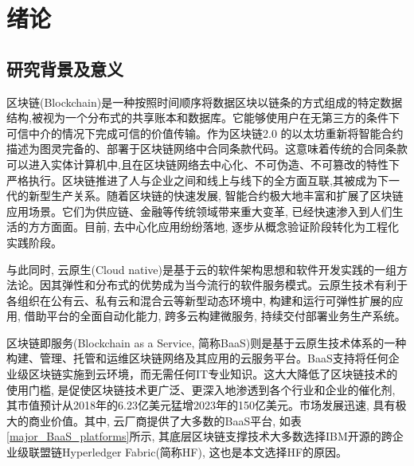 \chapter{绪论}

\section{研究背景及意义}

区块链(Blockchain)是一种按照时间顺序将数据区块以链条的方式组成的特定数据结构,被视为一个分布式的共享账本和数据库。它能够使用户在无第三方的条件下可信中介的情况下完成可信的价值传输\cite{SurveyofEnterpriseBlockchains}。作为区块链2.0 的以太坊\footnotemark[1]重新将智能合约描述为图灵完备的、部署于区块链网络中合同条款代码。这意味着传统的合同条款可以进入实体计算机中,且在区块链网络去中心化、不可伪造、不可篡改的特性下严格执行。区块链推进了人与企业之间和线上与线下的全方面互联,其被成为下一代的新型生产关系。随着区块链的快速发展, 智能合约极大地丰富和扩展了区块链应用场景。它们为供应链、金融等传统领域带来重大变革, 已经快速渗入到人们生活的方方面面。目前, 去中心化应用纷纷落地, 逐步从概念验证阶段转化为工程化实践阶段\footnotemark[2]。

与此同时, 云原生(Cloud native)是基于云的软件架构思想和软件开发实践的一组方法论。因其弹性和分布式的优势成为当今流行的软件服务模式。云原生技术有利于各组织在公有云、私有云和混合云等新型动态环境中, 构建和运行可弹性扩展的应用, 借助平台的全面自动化能力, 跨多云构建微服务, 持续交付部署业务生产系统。

区块链即服务(Blockchain as a Service, 简称BaaS)则是基于云原生技术体系的一种构建、管理、托管和运维区块链网络及其应用的云服务平台\cite{onik2019performance}。BaaS支持将任何企业级区块链实施到云环境，而无需任何IT专业知识。这大大降低了区块链技术的使用门槛, 是促使区块链技术更广泛、更深入地渗透到各个行业和企业的催化剂, 其市值预计从2018年的6.23亿美元猛增2023年的150亿美元\footnotemark[3]。市场发展迅速, 具有极大的商业价值。其中, 云厂商提供了大多数的BaaS平台\cite{KuernetesbasedFabricChaincodeManagementAndHihgAvailabilityTechnology}, 如表\ref{major_BaaS_platforms}所示, 其底层区块链支撑技术大多数选择IBM开源的跨企业级联盟链Hyperledger Fabric(简称HF), 这也是本文选择HF的原因。

